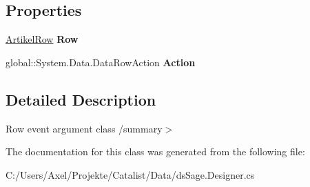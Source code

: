 \subsection*{Properties}
\begin{DoxyCompactItemize}
\item 
\hyperlink{class_products_1_1_data_1_1ds_sage_1_1_artikel_row}{Artikel\+Row} {\bfseries Row}\hypertarget{class_products_1_1_data_1_1ds_sage_1_1_artikel_row_change_event_aa317309afa1b15a433b090d8694b4467}{}\label{class_products_1_1_data_1_1ds_sage_1_1_artikel_row_change_event_aa317309afa1b15a433b090d8694b4467}

\item 
global\+::\+System.\+Data.\+Data\+Row\+Action {\bfseries Action}\hypertarget{class_products_1_1_data_1_1ds_sage_1_1_artikel_row_change_event_aa0731842170093719cb02ddcdd0f099f}{}\label{class_products_1_1_data_1_1ds_sage_1_1_artikel_row_change_event_aa0731842170093719cb02ddcdd0f099f}

\end{DoxyCompactItemize}


\subsection{Detailed Description}
Row event argument class /summary$>$ 

The documentation for this class was generated from the following file\+:\begin{DoxyCompactItemize}
\item 
C\+:/\+Users/\+Axel/\+Projekte/\+Catalist/\+Data/ds\+Sage.\+Designer.\+cs\end{DoxyCompactItemize}
